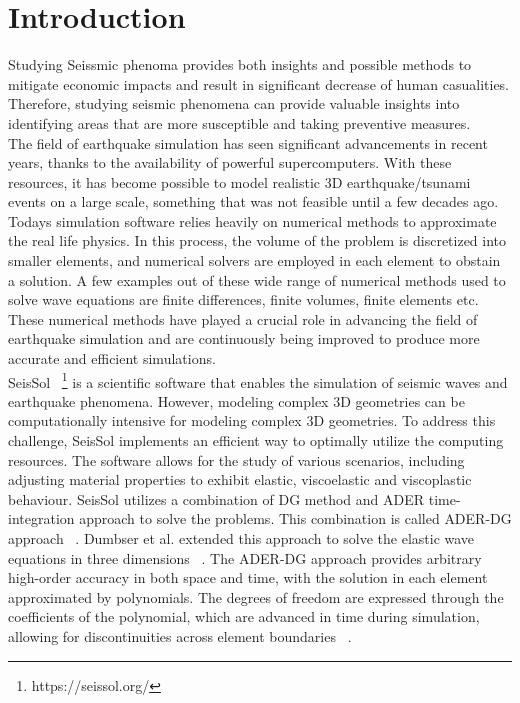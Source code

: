 
\chapter{Introduction}\label{chapter:introduction}

Studying Seissmic phenoma provides both insights and possible methods to mitigate economic impacts and result in significant decrease of human casualities.
Therefore, studying seismic phenomena can provide valuable insights into identifying areas that are more susceptible and taking preventive measures. \\

The field of earthquake simulation has seen significant advancements in recent years, thanks to the availability of powerful supercomputers.
With these resources, it has become possible to model realistic 3D earthquake/tsunami events on a large scale, something that was not feasible until a few decades ago. 
Todays simulation software relies heavily on numerical methods to approximate the real life physics. In this process, the volume of the problem is discretized into smaller elements, and numerical solvers are employed in each element to obstain a solution.
A few examples out of these wide range of numerical methods used to solve wave equations are finite differences, finite volumes, finite elements etc. These numerical methods have played a crucial role in advancing the field of earthquake simulation and are continuously being improved to produce more accurate and efficient simulations. \\

SeisSol ~\footnote[1]{https://seissol.org/} is a scientific software that enables the simulation of seismic waves and earthquake phenomena. However, modeling complex 3D geometries can be computationally intensive for modeling complex 3D geometries.
To address this challenge, SeisSol implements an efficient way to optimally utilize the computing resources. The software allows for the study of various scenarios, including adjusting material properties to exhibit elastic, viscoelastic and viscoplastic behaviour.
SeisSol utilizes a combination of \ac{DG} method and \ac{ADER} time-integration approach to solve the problems.
This combination is called \ac{ADER}-\ac{DG} approach ~\parencite{dumbser}. Dumbser et al. extended this approach to solve the elastic wave equations in three dimensions ~\parencite{dumbser1}. The \ac{ADER}-\ac{DG} approach provides arbitrary high-order accuracy in both space and time, with the solution in each element approximated by polynomials.
The degrees of freedom are expressed through the coefficients of the polynomial, which are advanced in time during simulation, allowing for discontinuities across element boundaries ~\parencite{martin}. \\

